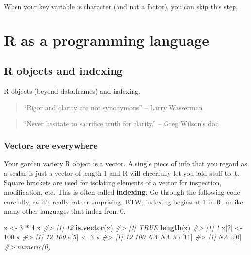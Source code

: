 \documentclass[
]{book}
\newenvironment{Shaded}{\begin{snugshade}}{\end{snugshade}}
\newcommand{\CommentTok}[1]{\textcolor[rgb]{0.56,0.35,0.01}{\textit{#1}}}
\newcommand{\DecValTok}[1]{\textcolor[rgb]{0.00,0.00,0.81}{#1}}
\newcommand{\KeywordTok}[1]{\textcolor[rgb]{0.13,0.29,0.53}{\textbf{#1}}}
\newcommand{\NormalTok}[1]{#1}
\newcommand{\OperatorTok}[1]{\textcolor[rgb]{0.81,0.36,0.00}{\textbf{#1}}}
\newcommand{\StringTok}[1]{\textcolor[rgb]{0.31,0.60,0.02}{#1}}
\begin{document}
When your key variable is character (and not a factor), you can skip this step.

\hypertarget{part-r-as-a-programming-language}{%
\part{R as a programming language}\label{part-r-as-a-programming-language}}

\hypertarget{r-objects}{%
\chapter{R objects and indexing}\label{r-objects}}

R objects (beyond data.frames) and indexing.

\begin{quote}
``Rigor and clarity are not synonymous'' -- Larry Wasserman
\end{quote}

\begin{quote}
``Never hesitate to sacrifice truth for clarity.'' -- Greg Wilson's dad
\end{quote}

\hypertarget{vectors-are-everywhere}{%
\section{Vectors are everywhere}\label{vectors-are-everywhere}}

Your garden variety R object is a vector. A single piece of info that you regard as a scalar is just a vector of length 1 and R will cheerfully let you add stuff to it. Square brackets are used for isolating elements of a vector for inspection, modification, etc. This is often called \textbf{indexing}. Go through the following code carefully, as it's really rather surprising. BTW, indexing begins at 1 in R, unlike many other languages that index from 0.

\begin{Shaded}
\begin{Highlighting}[]
\NormalTok{x <-}\StringTok{ }\DecValTok{3} \OperatorTok{*}\StringTok{ }\DecValTok{4}
\NormalTok{x}
\CommentTok{#> [1] 12}
\KeywordTok{is.vector}\NormalTok{(x)}
\CommentTok{#> [1] TRUE}
\KeywordTok{length}\NormalTok{(x)}
\CommentTok{#> [1] 1}
\NormalTok{x[}\DecValTok{2}\NormalTok{] <-}\StringTok{ }\DecValTok{100}
\NormalTok{x}
\CommentTok{#> [1]  12 100}
\NormalTok{x[}\DecValTok{5}\NormalTok{] <-}\StringTok{ }\DecValTok{3}
\NormalTok{x}
\CommentTok{#> [1]  12 100  NA  NA   3}
\NormalTok{x[}\DecValTok{11}\NormalTok{]}
\CommentTok{#> [1] NA}
\NormalTok{x[}\DecValTok{0}\NormalTok{]}
\CommentTok{#> numeric(0)}
\end{Highlighting}
\end{Shaded}
\end{document}
